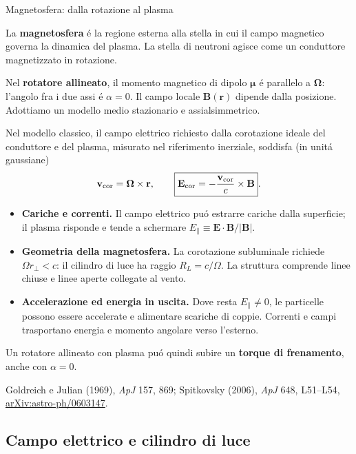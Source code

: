 \begin{frame}[t]{Magnetosfera: dalla rotazione al plasma}
\vspace*{3mm}
\small\raggedright
La \textbf{magnetosfera} \'e la regione esterna alla stella in cui
il campo magnetico governa la dinamica del plasma.
La stella di neutroni agisce come un conduttore magnetizzato in rotazione.
\par\smallskip
Nel \textbf{rotatore allineato}, il momento magnetico di dipolo
$\boldsymbol\mu$ \'e parallelo a $\boldsymbol\Omega$:
l'angolo fra i due assi \'e $\alpha=0$.
Il campo locale $\mathbf B(\mathbf r)$ dipende dalla posizione.
Adottiamo un modello medio stazionario e assialsimmetrico.
\par\smallskip
Nel modello classico, il campo elettrico richiesto dalla corotazione ideale
del conduttore e del plasma, misurato nel riferimento inerziale,
soddisfa (in unit\'a gaussiane)
\[
\mathbf v_{\rm cor}=\boldsymbol\Omega\times\mathbf r,
\qquad
\boxed{\mathbf E_{\rm cor}=-\frac{\mathbf v_{\rm cor}}c\times\mathbf B}.
\]
\begin{itemize}
\item \textbf{Cariche e correnti.}
Il campo elettrico pu\'o estrarre cariche dalla superficie;
il plasma risponde e tende a schermare
$E_\parallel\equiv\mathbf E\cdot\mathbf B/|\mathbf B|$.
\item \textbf{Geometria della magnetosfera.}
La corotazione subluminale richiede $\Omega r_\perp<c$:
il cilindro di luce ha raggio $R_L=c/\Omega$.
La struttura comprende linee chiuse e linee aperte collegate al vento.
\item \textbf{Accelerazione ed energia in uscita.}
Dove resta $E_\parallel\neq0$, le particelle possono essere accelerate
e alimentare scariche di coppie. Correnti e campi trasportano
energia e momento angolare verso l'esterno.
\end{itemize}
Un rotatore allineato con plasma pu\'o quindi subire un
\textbf{torque di frenamento}, anche con $\alpha=0$.
\par\smallskip
\footnotesize
Goldreich e Julian (1969), \emph{ApJ} 157, 869;
Spitkovsky (2006), \emph{ApJ} 648, L51--L54,
\href{https://arxiv.org/abs/astro-ph/0603147}{arXiv:astro-ph/0603147}.
\end{frame}


\subsection{Campo elettrico e cilindro di luce}


